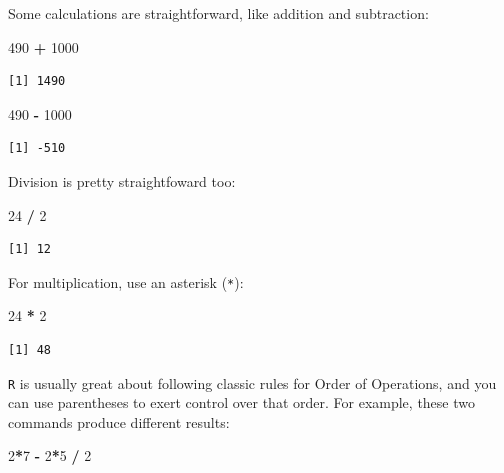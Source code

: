 \documentclass[
]{book}
\newenvironment{Shaded}{\begin{snugshade}}{\end{snugshade}}
\newcommand{\DecValTok}[1]{\textcolor[rgb]{0.00,0.00,0.81}{#1}}
\newcommand{\OperatorTok}[1]{\textcolor[rgb]{0.81,0.36,0.00}{\textbf{#1}}}
\newcommand{\StringTok}[1]{\textcolor[rgb]{0.31,0.60,0.02}{#1}}
\begin{document}
Some calculations are straightforward, like addition and subtraction:

\begin{Shaded}
\begin{Highlighting}[]
\DecValTok{490} \OperatorTok{+}\StringTok{ }\DecValTok{1000}
\end{Highlighting}
\end{Shaded}

\begin{verbatim}
[1] 1490
\end{verbatim}

\begin{Shaded}
\begin{Highlighting}[]
\DecValTok{490} \OperatorTok{-}\StringTok{ }\DecValTok{1000}
\end{Highlighting}
\end{Shaded}

\begin{verbatim}
[1] -510
\end{verbatim}

Division is pretty straightfoward too:

\begin{Shaded}
\begin{Highlighting}[]
\DecValTok{24} \OperatorTok{/}\StringTok{ }\DecValTok{2}
\end{Highlighting}
\end{Shaded}

\begin{verbatim}
[1] 12
\end{verbatim}

For multiplication, use an asterisk (\texttt{*}):

\begin{Shaded}
\begin{Highlighting}[]
\DecValTok{24} \OperatorTok{*}\StringTok{ }\DecValTok{2}
\end{Highlighting}
\end{Shaded}

\begin{verbatim}
[1] 48
\end{verbatim}

\texttt{R} is usually great about following classic rules for Order of Operations, and you can use parentheses to exert control over that order. For example, these two commands produce different results:

\begin{Shaded}
\begin{Highlighting}[]
\DecValTok{2}\OperatorTok{*}\DecValTok{7} \OperatorTok{-}\StringTok{ }\DecValTok{2}\OperatorTok{*}\DecValTok{5} \OperatorTok{/}\StringTok{ }\DecValTok{2}
\end{Highlighting}
\end{Shaded}
\end{document}
